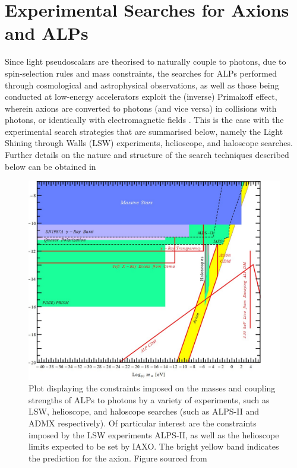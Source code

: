 \section{Experimental Searches for Axions and ALPs}\label{ALPExpt} 
Since light pseudoscalars are theorised to naturally couple to photons, due to spin-selection rules and mass constraints, the searches for ALPs performed through cosmological and astrophysical observations, as well as those
being conducted at low-energy accelerators exploit the (inverse) Primakoff effect, wherein axions are converted to photons (and vice versa) in collisions with photons, or identically with electromagnetic fields \cite{d'Enterria:2753504}. This is the case with the experimental search strategies
that are summarised below, namely the Light Shining through Walls (LSW) experiments, helioscope, and haloscope searches. Further details on the nature and structure of the search techniques described below can be obtained in \cite{doi:10.1146/annurev-nucl-102014-022120}
\begin{figure}[H]
    \centering      
    \includegraphics[scale = 0.45]{ALPExperimentalConstraints.jpg}
    \caption{Plot displaying the constraints imposed on the masses and coupling strengths of ALPs to photons by a variety of experiments, such as LSW, helioscope, and haloscope searches (such as ALPS-II and ADMX respectively). Of particular interest are the constraints imposed by the LSW experiments ALPS-II, as well as the helioscope limits expected to be set by IAXO. The bright yellow band indicates
    the prediction for the axion. Figure sourced from \cite{https://doi.org/10.48550/arxiv.1407.0546}}
    \label{ALPExperimentalConstraints}
\end{figure}
